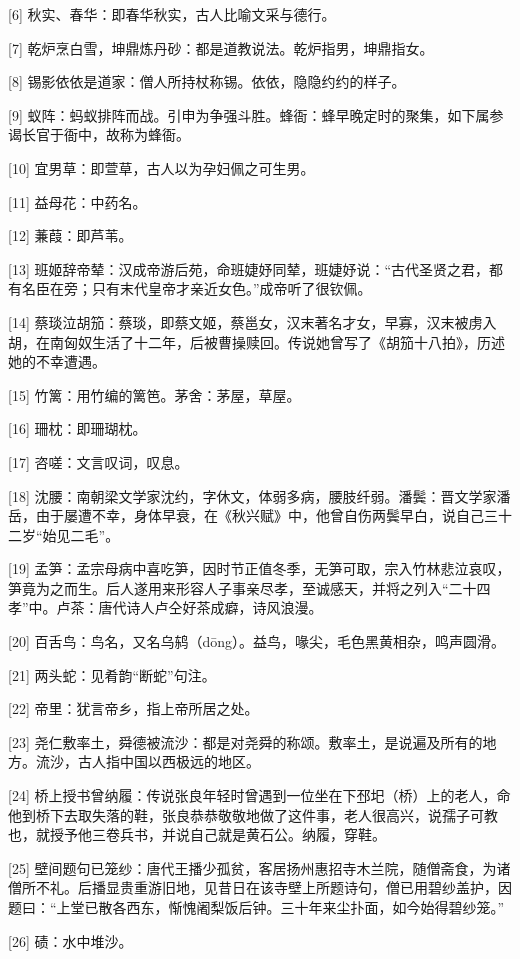 \documentclass[12pt,UTF8]{ctexbook}
\begin{document}
[6] 秋实、春华：即春华秋实，古人比喻文采与德行。

[7] 乾炉烹白雪，坤鼎炼丹砂：都是道教说法。乾炉指男，坤鼎指女。

[8] 锡影依依是道家：僧人所持杖称锡。依依，隐隐约约的样子。

[9] 蚁阵：蚂蚁排阵而战。引申为争强斗胜。蜂衙：蜂早晚定时的聚集，如下属参谒长官于衙中，故称为蜂衙。

[10] 宜男草：即萱草，古人以为孕妇佩之可生男。

[11] 益母花：中药名。

[12] 蒹葭：即芦苇。

[13] 班姬辞帝辇：汉成帝游后苑，命班婕妤同辇，班婕妤说：“古代圣贤之君，都有名臣在旁；只有末代皇帝才亲近女色。”成帝听了很钦佩。

[14] 蔡琰泣胡笳：蔡琰，即蔡文姬，蔡邕女，汉末著名才女，早寡，汉末被虏入胡，在南匈奴生活了十二年，后被曹操赎回。传说她曾写了《胡笳十八拍》，历述她的不幸遭遇。

[15] 竹篱：用竹编的篱笆。茅舍：茅屋，草屋。

[16] 珊枕：即珊瑚枕。

[17] 咨嗟：文言叹词，叹息。

[18] 沈腰：南朝梁文学家沈约，字休文，体弱多病，腰肢纤弱。潘鬓：晋文学家潘岳，由于屡遭不幸，身体早衰，在《秋兴赋》中，他曾自伤两鬓早白，说自己三十二岁“始见二毛”。

[19] 孟笋：孟宗母病中喜吃笋，因时节正值冬季，无笋可取，宗入竹林悲泣哀叹，笋竟为之而生。后人遂用来形容人子事亲尽孝，至诚感天，并将之列入“二十四孝”中。卢茶：唐代诗人卢仝好茶成癖，诗风浪漫。

[20] 百舌鸟：鸟名，又名乌鸫（dōng）。益鸟，喙尖，毛色黑黄相杂，鸣声圆滑。

[21] 两头蛇：见肴韵“断蛇”句注。

[22] 帝里：犹言帝乡，指上帝所居之处。

[23] 尧仁敷率土，舜德被流沙：都是对尧舜的称颂。敷率土，是说遍及所有的地方。流沙，古人指中国以西极远的地区。

[24] 桥上授书曾纳履：传说张良年轻时曾遇到一位坐在下邳圯（桥）上的老人，命他到桥下去取失落的鞋，张良恭恭敬敬地做了这件事，老人很高兴，说孺子可教也，就授予他三卷兵书，并说自己就是黄石公。纳履，穿鞋。

[25] 壁间题句已笼纱：唐代王播少孤贫，客居扬州惠招寺木兰院，随僧斋食，为诸僧所不礼。后播显贵重游旧地，见昔日在该寺壁上所题诗句，僧已用碧纱盖护，因题曰：“上堂已散各西东，惭愧阇梨饭后钟。三十年来尘扑面，如今始得碧纱笼。”

[26] 碛：水中堆沙。
\end{document}
